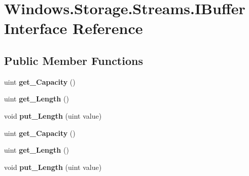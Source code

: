 \hypertarget{interface_windows_1_1_storage_1_1_streams_1_1_i_buffer}{}\section{Windows.\+Storage.\+Streams.\+I\+Buffer Interface Reference}
\label{interface_windows_1_1_storage_1_1_streams_1_1_i_buffer}
\subsection*{Public Member Functions}
\begin{DoxyCompactItemize}
\item 
\mbox{\label{interface_windows_1_1_storage_1_1_streams_1_1_i_buffer_a73aee2ef2c52acc14891ef47d26177d4}} 
uint {\bfseries get\+\_\+\+Capacity} ()
\item 
\mbox{\label{interface_windows_1_1_storage_1_1_streams_1_1_i_buffer_ab2bdd0bfe5d289ab0906235c00253ea8}} 
uint {\bfseries get\+\_\+\+Length} ()
\item 
\mbox{\label{interface_windows_1_1_storage_1_1_streams_1_1_i_buffer_af3c81c6537be15b7d1491efd58f4187f}} 
void {\bfseries put\+\_\+\+Length} (uint value)
\item 
\mbox{\label{interface_windows_1_1_storage_1_1_streams_1_1_i_buffer_a73aee2ef2c52acc14891ef47d26177d4}} 
uint {\bfseries get\+\_\+\+Capacity} ()
\item 
\mbox{\label{interface_windows_1_1_storage_1_1_streams_1_1_i_buffer_ab2bdd0bfe5d289ab0906235c00253ea8}} 
uint {\bfseries get\+\_\+\+Length} ()
\item 
\mbox{\label{interface_windows_1_1_storage_1_1_streams_1_1_i_buffer_af3c81c6537be15b7d1491efd58f4187f}} 
void {\bfseries put\+\_\+\+Length} (uint value)
\item 
\mbox{\label{interface_windows_1_1_storage_1_1_streams_1_1_i_buffer_a73aee2ef2c52acc14891ef47d26177d4}} 

\end{DoxyCompactItemize}
